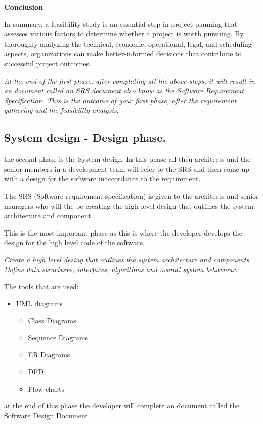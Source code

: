 \documentclass[a4paper]{article}
\begin{document}
\textbf{Conclusion}

In summary, a feasibility study is an essential step in project planning that assesses various factors to determine whether 
a project is worth pursuing. By thoroughly analyzing the technical, economic, operational, legal, and scheduling aspects, 
organizations can make better-informed decisions that contribute to successful project outcomes.

\textit{At the end of the first phase, after completing all the above steps, it will result in an document called an SRS document also know as the 
Software Requirement Specification. This is the outcome of your first phase, after the requirement gathering and the feasibility analysis.}

\subsection{System design - Design phase.}
the second phase is the System design.
In this phase all theu architects and the senior members in a development team will refer to the SRS and then come up with a design
for the software inaccordance to the requirement.  

The SRS (Software requirement specification) is given to the architects and senior managers who will the be creating the high level design that 
outlines the system architecture and component 

This is the most important phase as this is where the developer develops the design for the high level code of the software.  

\textit {Create a high level desing that outlines the system architecture and components. Define data structures, interfaces, algorithms and overall
system behaviour.}
  
The tools that are used:
\begin{itemize}
    \item UML diagrams
    \begin{itemize}
        \item Class Diagrams
        \item Sequence Diagrams
        \item ER Diagrams
        \item DFD
        \item Flow charts
    \end{itemize}    
\end{itemize}    

at the end of this phase the developer will complete an document called the Software Design Document. 
\end{document}
